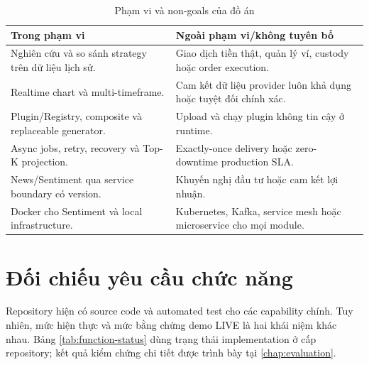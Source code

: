 \documentclass[12pt,a4paper,oneside]{report}
\begin{document}
\begin{table}[H]
  \centering
  \caption{Phạm vi và non-goals của đồ án}
  \label{tab:scope}
  \begin{tabularx}{\textwidth}{YY}
    \toprule
    \textbf{Trong phạm vi} & \textbf{Ngoài phạm vi/không tuyên bố} \\
    \midrule
    Nghiên cứu và so sánh strategy trên dữ liệu lịch sử. & Giao dịch tiền thật, quản lý ví, custody hoặc order execution. \\
    Realtime chart và multi-timeframe. & Cam kết dữ liệu provider luôn khả dụng hoặc tuyệt đối chính xác. \\
    Plugin/Registry, composite và replaceable generator. & Upload và chạy plugin không tin cậy ở runtime. \\
    Async jobs, retry, recovery và Top-K projection. & Exactly-once delivery hoặc zero-downtime production SLA. \\
    News/Sentiment qua service boundary có version. & Khuyến nghị đầu tư hoặc cam kết lợi nhuận. \\
    Docker cho Sentiment và local infrastructure. & Kubernetes, Kafka, service mesh hoặc microservice cho mọi module. \\
    \bottomrule
  \end{tabularx}
\end{table}

\section{Đối chiếu yêu cầu chức năng}

Repository hiện có source code và automated test cho các capability chính. Tuy nhiên, mức hiện thực và mức bằng chứng demo LIVE là hai khái niệm khác nhau. Bảng \ref{tab:function-status} dùng trạng thái implementation ở cấp repository; kết quả kiểm chứng chi tiết được trình bày tại \cref{chap:evaluation}.
\end{document}
